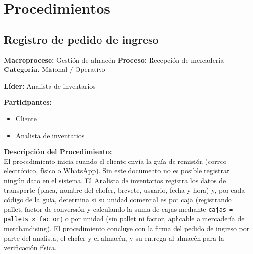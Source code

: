 \documentclass[11pt,letterpaper]{report}
\begin{document}
\newpage

\chapter{Procedimientos}

\section{Registro de pedido de ingreso}
\textbf{Macroproceso:} Gestión de almacén \quad\textbar\quad \textbf{Proceso:} Recepción de mercadería \quad\textbar\quad \textbf{Categoría:} Misional / Operativo

\textbf{Líder:} Analista de inventarios

\textbf{Participantes:}
\begin{itemize}
  \item Cliente
  \item Analista de inventarios
\end{itemize}

\textbf{Descripción del Procedimiento:} \\
El procedimiento inicia cuando el cliente envía la guía de remisión (correo electrónico, físico o WhatsApp). Sin este documento no es posible registrar ningún dato en el sistema. El Analista de inventarios registra los datos de transporte (placa, nombre del chofer, brevete, usuario, fecha y hora) y, por cada código de la guía, determina si su unidad comercial es por caja (registrando pallet, factor de conversión y calculando la suma de cajas mediante \texttt{cajas = pallets × factor}) o por unidad (sin pallet ni factor, aplicable a mercadería de merchandising). El procedimiento concluye con la firma del pedido de ingreso por parte del analista, el chofer y el almacén, y su entrega al almacén para la verificación física.
\end{document}
